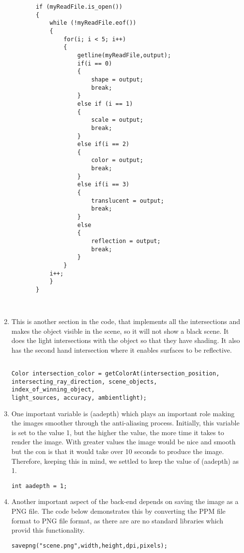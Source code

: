 \documentclass{article}
\begin{document}
\begin{enumerate}
\begin{lstlisting}
       if (myReadFile.is_open())
       {
           while (!myReadFile.eof())
           {
               for(i; i < 5; i++)
               {
                   getline(myReadFile,output);
                   if(i == 0)
                   {
                       shape = output;
                       break;
                   }
                   else if (i == 1)
                   {
                       scale = output;
                       break;
                   }
                   else if(i == 2)
                   {
                       color = output;
                       break;
                   }
                   else if(i == 3)
                   {
                       translucent = output;
                       break;
                   }
                   else
                   {
                       reflection = output;
                       break;
                   }
               }
           i++;
           }
       }



     \end{lstlisting}

\item  This is another section in the code, that implements all the intersections and makes the object visible in the scene, so it will not show a black scene.  It does the light intersections with the object so that they have shading. It also has the second hand intersection where it enables surfaces to be reflective.  
\begin{lstlisting}

Color intersection_color = getColorAt(intersection_position,
intersecting_ray_direction, scene_objects,
index_of_winning_object,
light_sources, accuracy, ambientlight); \end{lstlisting}

\item One important variable is (aadepth) which plays an important role making the images smoother through the anti-aliasing process. Initially, this variable is set to the value 1, but the higher the value, the more time it  takes to render the image. With greater values the image would be nice and smooth but the con is that it would take over 10 seconds to produce the image.  Therefore, keeping this in mind, we settled to keep the value of (aadepth) as 1.
\begin{lstlisting}
int aadepth = 1;
\end{lstlisting}

\item Another important aspect of the back-end depends on saving the image as a PNG file. The code below demonstrates this by converting the PPM file format to PNG file format, as there are are no standard libraries which provid this functionality. 
\begin{lstlisting}
savepng("scene.png",width,height,dpi,pixels);
\end{lstlisting}



\end{enumerate}
\end{document}
